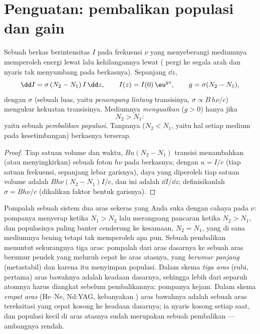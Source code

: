 \section{Penguatan: pembalikan populasi dan gain}

\begin{proposition}\label{prop:b2:laser:gain}
Sebuah berkas berintensitas $I$ pada frekuensi $\nu$ yang menyeberangi mediumnya
memperoleh energi lewat  lalu kehilangannya lewat 
( pergi ke segala arah dan nyaris tak menyumbang pada
berkasnya). Sepanjang $\dd z$,
\[
\dd I = \sigma\,(N_2 - N_1)\,I\,\dd z, \qquad
I(z) = I(0)\,\eu^{g z}, \qquad g = \sigma(N_2 - N_1),
\]
dengan $\sigma$ (sebuah luas, yaitu \emph{penampang lintang} transisinya, $\sigma \propto B\,h\nu/c$) mengukur
kekuatan transisinya. Mediumnya \emph{menguatkan} ($g > 0$)
hanya jika
\[
N_2 > N_1 :
\]
yaitu sebuah \emph{pembalikan populasi}. Tanpanya
($N_2 < N_1$, yaitu hal setiap medium pada kesetimbangan) berkasnya
terserap.
\end{proposition}

\begin{proof}
Tiap satuan volume dan waktu, $B u (N_2 - N_1)$ transisi menambahkan (atau menyingkirkan)
sebuah foton $h\nu$ pada berkasnya; dengan $u = I/c$ (tiap satuan frekuensi, sepanjang
lebar garisnya), daya yang diperoleh tiap satuan volume adalah
$B h\nu (N_2 - N_1) I/c$, dan ini adalah $\dd I/\dd z$; definisikanlah $\sigma =
Bh\nu/c$ (dikalikan faktor bentuk garisnya).
\end{proof}

\begin{remark}\label{rem:b2:laser:twolevel}
Pompalah sebuah sistem dua aras sekeras yang Anda suka dengan cahaya pada $\nu$:
pompanya menyerap ketika $N_1 > N_2$ lalu merangsang pancaran ketika $N_2 > N_1$,
dan populasinya paling banter cenderung ke kesamaan, $N_2 = N_1$, yang di sana
mediumnya bening tetapi tak memperoleh apa pun. Sebuah pembalikan menuntut sekurangnya
tiga aras: pompalah dari aras dasarnya ke sebuah aras berumur pendek yang
meluruh cepat ke aras  atasnya, yang \emph{berumur panjang}
(metastabil) dan karena itu menyimpan populasi. Dalam skema
\emph{tiga aras} (rubi, 
pertama) aras  bawahnya adalah keadaan dasarnya, sehingga lebih dari separuh
atomnya harus diangkat sebelum pembalikannya: pompanya kejam. Dalam skema
\emph{empat aras} (He--Ne, Nd:YAG, kebanyakan
) aras  bawahnya adalah sebuah aras tereksitasi yang cepat kosong
ke keadaan dasarnya; ia nyaris kosong setiap saat, dan populasi kecil
di aras atasnya sudah merupakan sebuah pembalikan --- ambangnya
rendah.
\end{remark}

